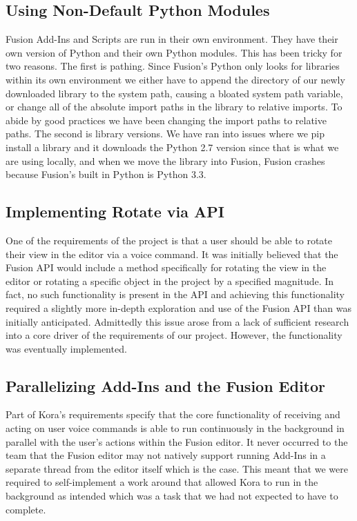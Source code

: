 \documentclass[onecolumn, draftclsnofoot,10pt, compsoc]{IEEEtran}
\begin{document}
    \subsection{Using Non-Default Python Modules}
    Fusion Add-Ins and Scripts are run in their own environment.
    They have their own version of Python and their own Python modules.
    This has been tricky for two reasons.
    The first is pathing.
    Since Fusion's Python only looks for libraries within its own environment we either have to append the directory of our newly downloaded library to the system path, causing a bloated system path variable, or change all of the absolute import paths in the library to relative imports.
    To abide by good practices we have been changing the import paths to relative paths.
    The second is library versions.
    We have ran into issues where we pip install a library and it downloads the Python 2.7 version since that is what we are using locally, and when we move the library into Fusion, Fusion crashes because Fusion's built in Python is Python 3.3.

    \subsection{Implementing Rotate via API}
    One of the requirements of the project is that a user should be able to rotate their view in the editor via a voice command.
    It was initially believed that the Fusion API would include a method specifically for rotating the view in the editor or rotating a specific object in the project by a specified magnitude.
    In fact, no such functionality is present in the API and achieving this functionality required a slightly more in-depth exploration and use of the Fusion API than was initially anticipated.
    Admittedly this issue arose from a lack of sufficient research into a core driver of the requirements of our project.
    However, the functionality was eventually implemented.


    \subsection{Parallelizing Add-Ins and the Fusion Editor}
    Part of Kora’s requirements specify that the core functionality of receiving and acting on user voice commands is able to run continuously in the background in parallel with the user’s actions within the Fusion editor.
    It never occurred to the team that the Fusion editor may not natively support running Add-Ins in a separate thread from the editor itself which is the case.
    This meant that we were required to self-implement a work around that allowed Kora to run in the background as intended which was a task that we had not expected to have to complete.
\end{document}
